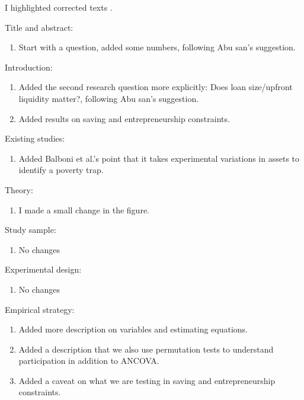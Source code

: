 I highlighted corrected texts .

\vspace{2ex}
Title and abstract:
\begin{enumerate}
\vspace{1.0ex}\setlength{\itemsep}{1.0ex}\setlength{\baselineskip}{12pt}
\item	Start with a question, added some numbers, following Abu san's suggestion.
\end{enumerate}
Introduction:
\begin{enumerate}
\vspace{1.0ex}\setlength{\itemsep}{1.0ex}\setlength{\baselineskip}{12pt}
\item	Added the second research question more explicitly: Does loan size/upfront liquidity matter?, following Abu san's suggestion.
\item	Added results on saving and entrepreneurship constraints. 
\end{enumerate}
Existing studies:
\begin{enumerate}
\vspace{1.0ex}\setlength{\itemsep}{1.0ex}\setlength{\baselineskip}{12pt}
\item	Added Balboni et al.'s point that it takes experimental variations in assets to identify a poverty trap.
\end{enumerate}
Theory:
\begin{enumerate}
\vspace{1.0ex}\setlength{\itemsep}{1.0ex}\setlength{\baselineskip}{12pt}
\item	I made a small change in the figure. 
\end{enumerate}
Study sample:
\begin{enumerate}
\vspace{1.0ex}\setlength{\itemsep}{1.0ex}\setlength{\baselineskip}{12pt}
\item	No changes
\end{enumerate}
Experimental design:
\begin{enumerate}
\vspace{1.0ex}\setlength{\itemsep}{1.0ex}\setlength{\baselineskip}{12pt}
\item	No changes
\end{enumerate}
Empirical strategy:
\begin{enumerate}
\vspace{1.0ex}\setlength{\itemsep}{1.0ex}\setlength{\baselineskip}{12pt}
\item	Added more description on variables and estimating equations.
\item	Added a description that we also use permutation tests to understand participation in addition to ANCOVA. 
\item	Added a caveat on what we are testing in saving and entrepreneurship constraints.
\end{enumerate}
